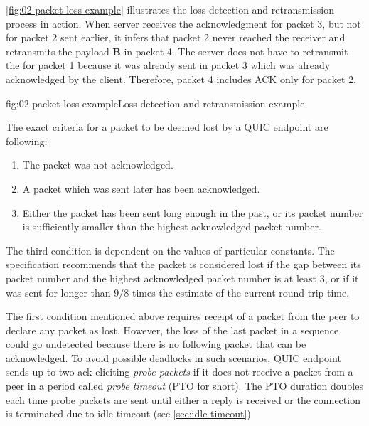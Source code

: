 \autoref{fig:02-packet-loss-example} illustrates the loss detection and retransmission process in
action. When server receives the acknowledgment for packet 3, but not for packet 2 sent earlier, it
infers that packet 2 never reached the receiver and retransmits the payload \textbf{B} in packet 4.
The server does not have to retransmit the \ACK{} for packet 1 because it was already sent in packet
3 which was already acknowledged by the client. Therefore, packet 4 includes ACK only for packet 2.

\begin{myFigure}{fig:02-packet-loss-example}{Loss detection and retransmission example}



\end{myFigure}

The exact criteria for a packet to be deemed lost by a QUIC endpoint are following:

\begin{enumerate}

  \item The packet was not acknowledged.

  \item A packet which was sent later has been acknowledged.

  \item Either the packet has been sent long enough in the past, or its packet number is
sufficiently smaller than the highest acknowledged packet number.

\end{enumerate}

The third condition is dependent on the values of particular constants. The specification recommends
that the packet is considered lost if the gap between its packet number and the highest acknowledged
packet number is at least 3, or if it was sent for longer than $9/8$ times the estimate of the
current round-trip time.

The first condition mentioned above requires receipt of a packet from the peer to declare any packet
as lost. However, the loss of the last packet in a sequence could go undetected because there is no
following packet that can be acknowledged. To avoid possible deadlocks in such scenarios, QUIC
endpoint sends up to two ack-eliciting \textit{probe packets} if it does not receive a packet from a
peer in a period called \textit{probe timeout} (PTO for short). The PTO duration doubles each time
probe packets are sent until either a reply is received or the connection is terminated due to idle
timeout (see \autoref{sec:idle-timeout})

